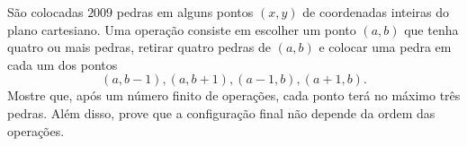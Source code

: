 São colocadas $2009$ pedras em alguns pontos $(x, y)$ de coordenadas inteiras do plano cartesiano.
Uma operação consiste em escolher um ponto $(a, b)$ que tenha quatro ou mais pedras, retirar quatro pedras de $(a, b)$ e colocar uma pedra em cada um dos pontos
$$(a, b - 1), (a, b + 1), (a - 1, b), (a + 1, b).$$
Mostre que, após um número finito de operações, cada ponto terá no máximo três pedras. Além disso, prove que a configuração final não depende da ordem das operações.